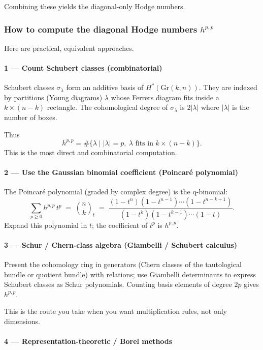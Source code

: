 \documentclass{amsart}
\theoremstyle{plain}
\theoremstyle{definition}
\theoremstyle{remark}
\begin{document}
Combining these yields the diagonal-only Hodge numbers.

\subsubsection{How to compute the diagonal Hodge numbers \texorpdfstring{$h^{p,p}$}{h^p,p}}

Here are practical, equivalent approaches.

\paragraph{1 — Count Schubert classes (combinatorial)}

Schubert classes $\sigma_\lambda$ form an additive basis of $H^*(\mathrm{Gr}(k,n))$. They are indexed by partitions (Young diagrams) $\lambda$ whose Ferrers diagram fits inside a $k\times (n-k)$ rectangle. The cohomological degree of $\sigma_\lambda$ is $2|\lambda|$ where $|\lambda|$ is the number of boxes.

Thus
\[
h^{p,p} = \#\{\lambda \mid |\lambda|=p,\ \lambda\text{ fits in }k\times(n-k)\}.
\]
This is the most direct and combinatorial computation.

\paragraph{2 — Use the Gaussian binomial coefficient (Poincaré polynomial)}

The Poincaré polynomial (graded by complex degree) is the q-binomial:
\[
\sum_{p\ge0} h^{p,p} \, t^p \;=\; \binom{n}{k}_t
\;=\; \frac{(1-t^n)(1-t^{n-1})\cdots(1-t^{n-k+1})}{(1-t^k)(1-t^{k-1})\cdots(1-t)}.
\]
Expand this polynomial in $t$; the coefficient of $t^p$ is $h^{p,p}$.

\paragraph{3 — Schur / Chern-class algebra (Giambelli / Schubert calculus)}

Present the cohomology ring in generators (Chern classes of the tautological bundle or quotient bundle) with relations; use Giambelli determinants to express Schubert classes as Schur polynomials. Counting basis elements of degree $2p$ gives $h^{p,p}$.

This is the route you take when you want multiplication rules, not only dimensions.

\paragraph{4 — Representation-theoretic / Borel methods}
\end{document}
